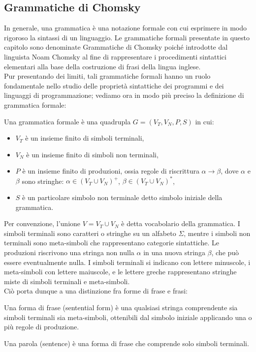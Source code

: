 \documentclass{article}
\begin{document}
\subsection{Grammatiche di Chomsky}
In generale, una grammatica è una notazione formale con cui esprimere in modo rigoroso la sintassi di un linguaggio. Le grammatiche formali presentate in questo capitolo sono denominate Grammatiche di Chomsky poiché introdotte dal linguista Noam Chomsky al fine di rappresentare i procedimenti sintattici elementari alla base della costruzione di frasi della lingua inglese.\\Pur presentando dei limiti, tali grammatiche formali hanno un ruolo fondamentale nello studio delle proprietà sintattiche dei programmi e dei linguaggi di programmazione; vediamo ora in modo più preciso la definizione di grammatica formale:
\\\noindent %
\begin{definition}
Una grammatica formale è una quadrupla \( G = (V_T, V_N, P, S) \) in cui:
\begin{itemize}
    \item \( V_T \) è un insieme finito di simboli terminali,
    \item \( V_N \) è un insieme finito di simboli non terminali,
    \item \( P \) è un insieme finito di produzioni, ossia regole di riscrittura \( \alpha \rightarrow \beta \), dove \( \alpha \) e \( \beta \) sono stringhe: \( \alpha \in (V_T \cup V_N)^+ \), \( \beta \in (V_T \cup V_N)^* \),
    \item \( S \) è un particolare simbolo non terminale detto simbolo iniziale della grammatica.
\end{itemize}
\end{definition}

\noindent Per convenzione, l'unione \( V = V_T \cup V_N \) è detta vocabolario della grammatica. I simboli terminali sono caratteri o stringhe su un alfabeto \( \Sigma \), mentre i simboli non terminali sono meta-simboli che rappresentano categorie sintattiche. Le produzioni riscrivono una stringa non nulla \( \alpha \) in una nuova stringa \( \beta \), che può essere eventualmente nulla.
I simboli terminali si indicano con lettere minuscole, i meta-simboli con lettere maiuscole, e le lettere greche rappresentano stringhe miste di simboli terminali e meta-simboli.\\\noindent Ciò porta dunque a una distinzione fra forme di frase e frasi:
\begin{definition}
Una forma di frase (sentential form) è una qualsiasi stringa comprendente sia simboli terminali sia meta-simboli, ottenibili dal simbolo iniziale applicando una o più regole di produzione.
\end{definition}
\begin{definition}
Una parola (sentence) è una forma di frase che comprende solo simboli terminali.
\end{definition}
\end{document}
